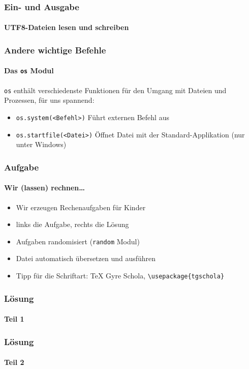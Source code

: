\documentclass[12pt,ngerman]{beamer}
\newcounter{Aufgabe}
\begin{document}
\begin{frame}[fragile]
\frametitle{Ein- und Ausgabe}
\framesubtitle{UTF8-Dateien lesen und schreiben}

 

\end{frame}

\begin{frame}[fragile]
\frametitle{Andere wichtige Befehle}
\framesubtitle{Das \texttt{os} Modul}

\texttt{os} enthält verschiedenste Funktionen für den Umgang mit Dateien und Prozessen, für uns spannend:

\begin{itemize}
\item \lstinline{os.system(<Befehl>)} Führt externen Befehl aus
\item \lstinline{os.startfile(<Datei>)} Öffnet Datei mit der Standard-Applikation (nur unter Windows)
\end{itemize}
\end{frame}

\begin{frame}[fragile]
\frametitle{Aufgabe \theAufgabe}
\framesubtitle{Wir (lassen) rechnen\ldots}

\begin{itemize}
\item Wir erzeugen Rechenaufgaben für Kinder
\item links die Aufgabe, rechts die Lösung
\item Aufgaben randomisiert (\texttt{random} Modul)
\item Datei automatisch übersetzen und ausführen
\item Tipp für die Schriftart: TeX Gyre Schola, \verb|\usepackage{tgschola}|
\end{itemize}
\end{frame}

\begin{frame}[fragile]
\frametitle{Lösung}
\framesubtitle{Teil 1}

 

\end{frame}

\begin{frame}[fragile]
\frametitle{Lösung}
\framesubtitle{Teil 2}

 

\end{frame}
\end{document}
